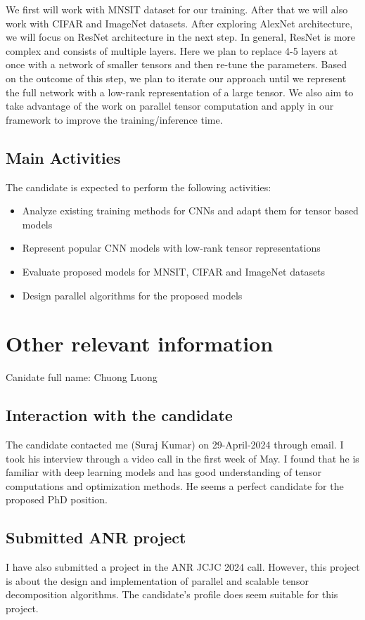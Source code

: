 \documentclass[11pt]{article}
\begin{document}
We first will work with  MNSIT dataset for our training. After that we will also work with CIFAR and ImageNet datasets. After exploring AlexNet architecture, we will focus on ResNet architecture in the next step. In general, ResNet is more complex and consists of  multiple layers. Here we plan to replace 4-5 layers at once with a network of smaller tensors and then re-tune the parameters. Based on the outcome of this step, we plan to iterate our approach until we represent the full network with a low-rank representation of a large tensor. We also aim to take advantage of the  work on parallel tensor computation and apply in our framework to improve the training/inference time.


\subsection*{Main Activities}

The candidate is expected to perform the following activities:
\begin{itemize}
	\item Analyze existing training methods for CNNs and adapt them for tensor based models
	\item Represent popular CNN models with low-rank tensor representations
	\item Evaluate proposed models for MNSIT, CIFAR and ImageNet datasets
	\item Design parallel algorithms for the proposed models
\end{itemize}

%

\section{Other relevant information}
Canidate full name: Chuong Luong
\subsection*{Interaction with the candidate}
The candidate contacted me (Suraj Kumar) on 29-April-2024 through email. I took his interview through a video call in the first week of May. I found that he is familiar with deep learning models and has good understanding of tensor computations and optimization methods. He seems a perfect candidate for the proposed PhD position. 
 
\subsection*{Submitted ANR project }
I have also submitted a project in the ANR JCJC 2024 call. However, this project is about the design and implementation  of parallel and scalable tensor decomposition algorithms. The candidate's profile does seem suitable for this project.
{
\small


}
\end{document}
